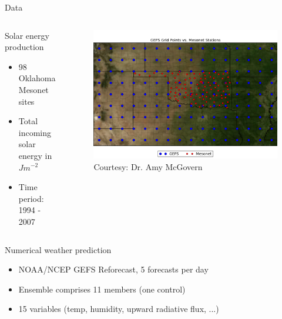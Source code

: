 \documentclass[handout]{beamer}
\begin{document}

\begin{frame}{Data}

\begin{columns}[T]
    \begin{column}{.45\textwidth}

\begin{block}{Solar energy production}
  \begin{itemize}
     \item 98 Oklahoma Mesonet sites
     \item Total incoming solar energy in $J m^{-2}$
     \item Time period: 1994 - 2007
  \end{itemize}
\end{block}

    \end{column}
    \begin{column}{.45\textwidth}

  \begin{figure}
    \includegraphics[width=\textwidth]{images/gefs_mesonet_stations.png}\\
    {\color{gray}\tiny{Courtesy: Dr. Amy McGovern}}
  \end{figure}

    \end{column}
  \end{columns}

\begin{block}{Numerical weather prediction}
\begin{itemize}
     \item NOAA/NCEP GEFS Reforecast, 5 forecasts per day
     \item Ensemble comprises 11 members (one control)
     \item 15 variables (temp, humidity, upward radiative flux, ...)
  \end{itemize}
\end{block}

\end{frame}
\end{document}
